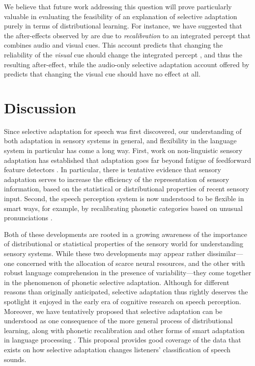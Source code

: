 We believe that future work addressing this question will prove particularly valuable in evaluating the feasibility of an explanation of selective adaptation purely in terms of distributional learning. For instance, we have suggested that the after-effects observed by \textcite{Saldana1994} are due to \emph{recalibration} to an integrated percept that combines audio and visual cues.  This account predicts that changing the reliability of the \emph{visual} cue should change the integrated percept \autocite[as observed by ][]{Bejjanki2011,Ernst2004}, and thus the resulting after-effect, while the audio-only selective adaptation account offered by \textcite{Saldana1994} predicts that changing the visual cue should have no effect at all.


\section{Discussion}
\label{sec:discussion}

Since selective adaptation for speech was first discovered, our understanding of both adaptation in sensory systems in general, and flexibility in the language system in particular has come a long way.  First, work on non-linguistic sensory adaptation has established that adaptation goes far beyond fatigue of feedforward feature detectors \cite{Brenner2000,Dragoi2000,Fairhall2001,Gutfreund2012,Kohn2004,Kohn2007,Sharpee2006,Webster2005}.  In particular, there is tentative evidence that sensory adaptation serves to increase the efficiency of the representation of sensory information, based on the statistical or distributional properties of recent sensory input.  Second, the speech perception system is now understood to be flexible in smart ways, for example, by recalibrating phonetic categories based on unusual pronunciations \cite{Bertelson2003,Kraljic2005,Norris2003}.

Both of these developments are rooted in a growing awareness of the importance of distributional or statistical properties of the sensory world for understanding sensory systems.  While these two developments may appear rather dissimilar---one concerned with the allocation of scarce neural resources, and the other with robust language comprehension in the presence of variability---they come together in the phenomenon of phonetic selective adaptation. Although for different reasons than originally anticipated, selective adaptation thus rightly deserves the spotlight it enjoyed in the early era of cognitive research on speech perception.  Moreover, we have tentatively proposed that selective adaptation can be understood as one consequence of the more general process of distributional learning, along with phonetic recalibration and other forms of smart adaptation in language processing \cite{Kleinschmidt2015}.  This proposal provides good coverage of the data that exists on how selective adaptation changes listeners' classification of speech sounds.

